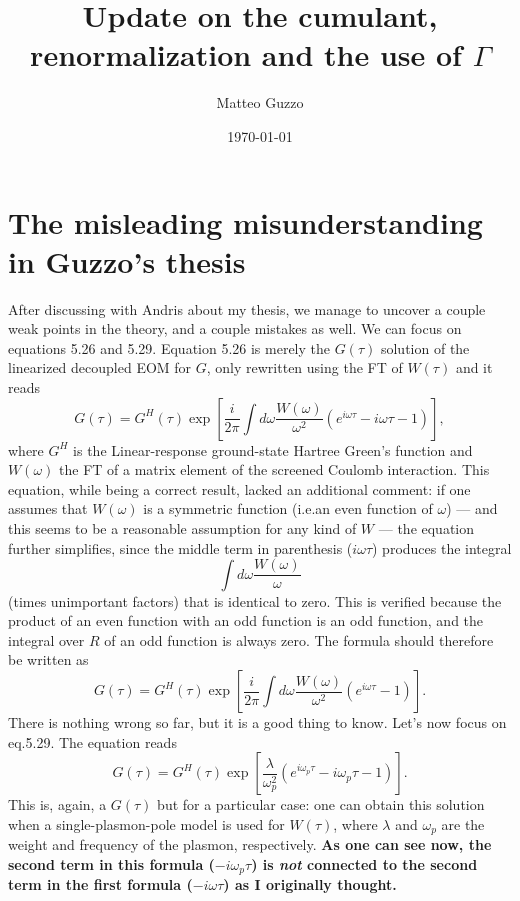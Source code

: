 \documentclass[a4paper,12pt]{article}
\title{Update on the cumulant, renormalization and the use of $\Gamma$}
\author{Matteo Guzzo}
\date{\today}
\def\be{\begin{equation}}
\def\ee{\end{equation}}
\begin{document}
\maketitle

\tableofcontents

\section{The misleading misunderstanding in Guzzo's thesis}

After discussing with Andris about my thesis, we manage to uncover a couple weak 
points in the theory, and a couple mistakes as well. 
We can focus on equations 5.26 and 5.29. 
Equation 5.26 is merely the $G(\tau)$ solution of the linearized decoupled EOM for $G$, only 
rewritten using the FT of ${W}(\tau)$  
and it reads
\be
 G(\tau) = G^H (\tau) \exp \left[ \frac{i}{2\pi}  \int \! d\omega \frac{ W (\omega) }{ \omega^2 } 
   \left( e^{i\omega\tau} - i \omega \tau - 1 \right) \right] ,
\ee 
where $G^H$ is the Linear-response ground-state Hartree Green's function and 
$W(\omega)$ the FT of a matrix element of the screened Coulomb interaction. 
This equation, while being a correct result, lacked an additional comment: 
if one assumes that $W(\omega)$ is a symmetric function (i.e.\@ an even function of $\omega$) 
--- and this seems to be a reasonable assumption for any kind of $W$ --- 
the equation further simplifies, since the middle term in parenthesis ($i\omega\tau$)
produces the integral 
\be
  \int \! d\omega \frac{ W (\omega) }{ \omega } 
\ee 
(times unimportant factors) that is identical to zero. 
This is verified because the product of an even function with an odd function is an odd function, 
and the integral over $R$ of an odd function is always zero. 
The formula should therefore be written as 
\be
 G(\tau) = G^H (\tau) \exp \left[ \frac{i}{2\pi}  \int \! d\omega \frac{ W (\omega) }{ \omega^2 } 
   \left( e^{i\omega\tau} - 1 \right) \right] . 
\ee 
There is nothing wrong so far, but it is a good thing to know. 
Let's now focus on eq.\@ 5.29. 
The equation reads
\be
 G(\tau) = G^H (\tau) \exp \left[ \frac{\lambda}{\omega_p^2}  
   \left( e^{i\omega_p\tau} - i \omega_p \tau - 1 \right) \right] . 
\ee
This is, again, a $G(\tau)$ but for a particular case: one can obtain this solution when a 
single-plasmon-pole model is used for $W(\tau)$, where $\lambda$ and $\omega_p$ are 
the weight and frequency of the plasmon, respectively. 
\textbf{As one can see now, the second term in this formula ($-i\omega_p\tau$) is \emph{not} 
connected to the second term in the first formula ($-i\omega\tau$) as I originally thought.}
\end{document}
